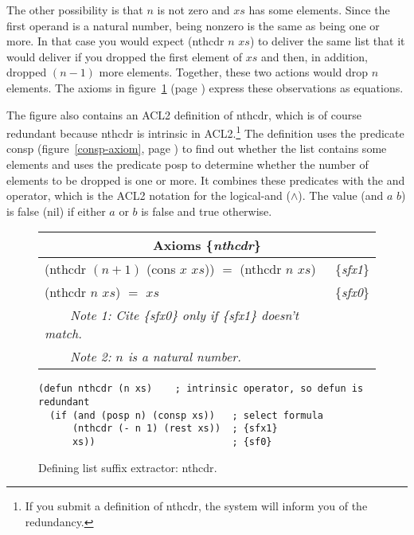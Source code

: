 The other possibility is that $n$ is not zero and $xs$ has some elements.
Since the first operand is a natural number,
being nonzero is the same as being one or more.
In that case you would expect \textsf{(nthcdr $n$ $xs$)} to deliver
the same list that it would deliver
if you dropped the first element of $xs$
and then, in addition, dropped $(n - 1)$ more elements.
Together, these two actions would drop $n$ elements.
The axioms in figure~\ref{fig:nthcdr-defun} (page \pageref{fig:nthcdr-defun})
express these observations as equations.

The figure also contains an ACL2 definition of \textsf{nthcdr}, which
is of course redundant because \textsf{nthcdr} is intrinsic in ACL2.\footnote{If
you submit a definition of \textsf{nthcdr},
the system will inform you of the redundancy.}
The definition uses the predicate \textsf{consp}
(figure~\ref{consp-axiom}, page \pageref{consp-axiom})
to find out whether the list contains some elements and
uses the predicate
\label{posp-def} \textsf{posp}
to determine whether
the number of elements to be dropped is one or more.
It combines these predicates with the \textsf{and} operator,
which is the ACL2 notation for the logical-and ($\wedge$).
\label{and-op=informal}
The value \textsf{(and $a$ $b$)} is false (nil)
if either $a$ or $b$ is false and true otherwise.

\begin{figure}
\begin{center}
\begin{tabular}{ll}
\multicolumn{2}{c}{Axioms \{\emph{nthcdr}\}} \\
\hline
\textsf{(nthcdr $(n+1)$ (cons $x$ $xs$))} $=$ \textsf{(nthcdr $n$ $xs$)} & \{\emph{sfx1}\} \\
\textsf{(nthcdr $n$ $xs$)} $=$ $xs$                            & \{\emph{sfx0}\}   \\
~~~~\emph{Note 1: Cite \{\emph{sfx0}\} only if \{\emph{sfx1}\} doesn't match.}&\\ %
~~~~\emph{Note 2: $n$ is a natural number.}
\end{tabular}
\begin{code}
\begin{verbatim}
(defun nthcdr (n xs)    ; intrinsic operator, so defun is redundant
  (if (and (posp n) (consp xs))   ; select formula
      (nthcdr (- n 1) (rest xs))  ; {sfx1}
      xs))                        ; {sf0}
\end{verbatim}
\end{code}
\end{center}
\caption{Defining list suffix extractor: \textsf{nthcdr}.}
\label{fig:nthcdr-defun}
\end{figure}

